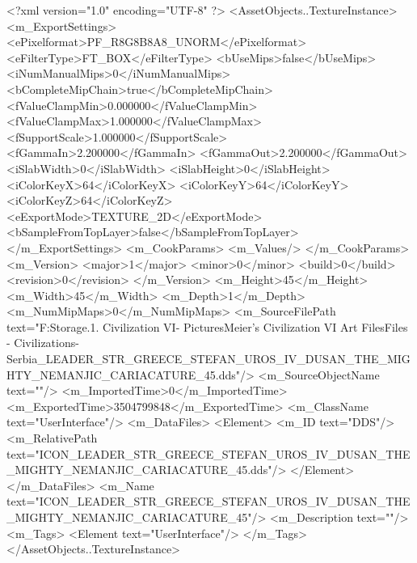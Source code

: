 <?xml version="1.0" encoding="UTF-8" ?>
<AssetObjects..TextureInstance>
	<m_ExportSettings>
		<ePixelformat>PF_R8G8B8A8_UNORM</ePixelformat>
		<eFilterType>FT_BOX</eFilterType>
		<bUseMips>false</bUseMips>
		<iNumManualMips>0</iNumManualMips>
		<bCompleteMipChain>true</bCompleteMipChain>
		<fValueClampMin>0.000000</fValueClampMin>
		<fValueClampMax>1.000000</fValueClampMax>
		<fSupportScale>1.000000</fSupportScale>
		<fGammaIn>2.200000</fGammaIn>
		<fGammaOut>2.200000</fGammaOut>
		<iSlabWidth>0</iSlabWidth>
		<iSlabHeight>0</iSlabHeight>
		<iColorKeyX>64</iColorKeyX>
		<iColorKeyY>64</iColorKeyY>
		<iColorKeyZ>64</iColorKeyZ>
		<eExportMode>TEXTURE_2D</eExportMode>
		<bSampleFromTopLayer>false</bSampleFromTopLayer>
	</m_ExportSettings>
	<m_CookParams>
		<m_Values/>
	</m_CookParams>
	<m_Version>
		<major>1</major>
		<minor>0</minor>
		<build>0</build>
		<revision>0</revision>
	</m_Version>
	<m_Height>45</m_Height>
	<m_Width>45</m_Width>
	<m_Depth>1</m_Depth>
	<m_NumMipMaps>0</m_NumMipMaps>
	<m_SourceFilePath text="F:\Mod Storage\2.1. Civilization VI\Mods\Archive - Pictures\Sid Meier's Civilization VI Art Files\Art Files - Civilizations\Civilization - Serbia\ICON_LEADER_STR_GREECE_STEFAN_UROS_IV_DUSAN_THE_MIGHTY_NEMANJIC_CARIACATURE_45.dds"/>
	<m_SourceObjectName text=""/>
	<m_ImportedTime>0</m_ImportedTime>
	<m_ExportedTime>3504799848</m_ExportedTime>
	<m_ClassName text="UserInterface"/>
	<m_DataFiles>
		<Element>
			<m_ID text="DDS"/>
			<m_RelativePath text="ICON_LEADER_STR_GREECE_STEFAN_UROS_IV_DUSAN_THE_MIGHTY_NEMANJIC_CARIACATURE_45.dds"/>
		</Element>
	</m_DataFiles>
	<m_Name text="ICON_LEADER_STR_GREECE_STEFAN_UROS_IV_DUSAN_THE_MIGHTY_NEMANJIC_CARIACATURE_45"/>
	<m_Description text=""/>
	<m_Tags>
		<Element text="UserInterface"/>
	</m_Tags>
</AssetObjects..TextureInstance>

